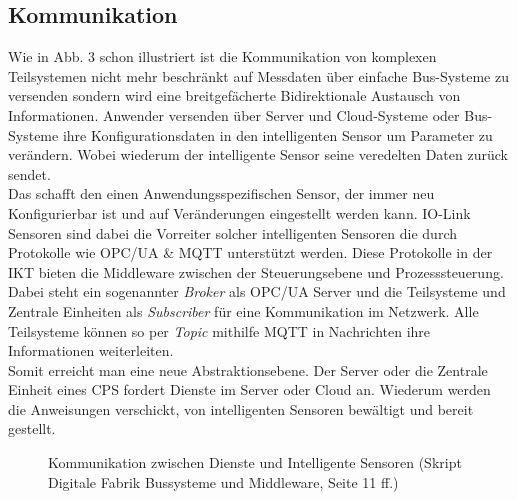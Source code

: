 \documentclass[a4paper,12pt]{scrartcl}
\begin{document}
\subsection{Kommunikation}
Wie in Abb. 3 schon illustriert ist die Kommunikation von komplexen Teilsystemen nicht mehr beschränkt auf Messdaten über einfache Bus-Systeme zu versenden sondern wird eine breitgefächerte Bidirektionale Austausch von Informationen. Anwender versenden über Server und Cloud-Systeme oder Bus-Systeme ihre Konfigurationsdaten in den intelligenten Sensor um Parameter zu verändern. Wobei wiederum der intelligente Sensor seine veredelten Daten zurück sendet.\\
Das schafft den einen Anwendungsspezifischen Sensor, der immer neu Konfigurierbar ist und auf Veränderungen eingestellt werden kann. IO-Link Sensoren sind dabei die Vorreiter solcher intelligenten Sensoren die durch Protokolle wie OPC/UA \& MQTT unterstützt werden. Diese Protokolle in der IKT bieten die Middleware zwischen der Steuerungsebene und Prozesssteuerung. Dabei steht ein sogenannter \textit{Broker} als OPC/UA Server und die Teilsysteme und Zentrale Einheiten als \textit{Subscriber} für eine Kommunikation im Netzwerk. Alle Teilsysteme können so per \textit{Topic} mithilfe MQTT in Nachrichten ihre Informationen weiterleiten.\\
Somit erreicht man eine neue Abstraktionsebene. Der Server oder die Zentrale Einheit eines CPS fordert Dienste im Server oder Cloud an. Wiederum werden die Anweisungen verschickt, von intelligenten Sensoren bewältigt und bereit gestellt.
\vspace{0.5cm}

\begin{figure}[H]
\centering
\begin{adjustbox}{max width=\textwidth}
\end{adjustbox}
  \caption{Kommunikation zwischen Dienste und Intelligente Sensoren (Skript Digitale Fabrik Bussysteme und Middleware, Seite 11 ff.)}
 \label{fig:Kommunikation zwischen Dienste und Intelligente Sensoren} 
\end{figure}
  
\end{document}
